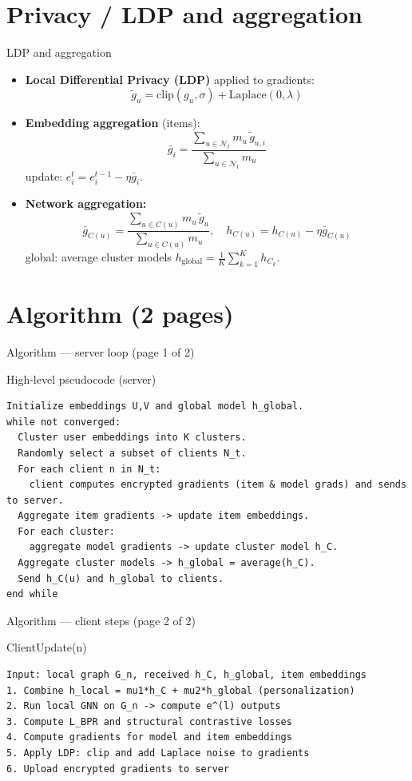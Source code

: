 \documentclass{beamer}
\begin{document}
\section{Privacy / LDP and aggregation}
\begin{frame}{LDP and aggregation}
  \begin{itemize}
    \item \textbf{Local Differential Privacy (LDP)} applied to gradients:
      \[
        \tilde g_u = \mathrm{clip}(g_u,\sigma) + \mathrm{Laplace}(0,\lambda)
      \]
    \item \textbf{Embedding aggregation} (items):
      \[
        \bar g_i = \frac{\sum_{u\in \mathcal{N}_t} m_u \,\tilde g_{u,i}}{\sum_{u\in \mathcal{N}_t} m_u}
      \]
      update: $e_i^{t}=e_i^{t-1}-\eta \bar g_i$.
    \item \textbf{Network aggregation:}
      \[
        \bar g_{C(u)} = \frac{\sum_{u\in C(u)} m_u\,\tilde g_u}{\sum_{u\in C(u)} m_u},\quad
        h_{C(u)} = h_{C(u)} - \eta \bar g_{C(u)}
      \]
      global: average cluster models $h_{\text{global}} = \frac{1}{K}\sum_{k=1}^K h_{C_k}$.
  \end{itemize}
\end{frame}

\section{Algorithm (2 pages)}
\begin{frame}[fragile]{Algorithm — server loop (page 1 of 2)}
\begin{block}{High-level pseudocode (server)}
\begin{verbatim}
Initialize embeddings U,V and global model h_global.
while not converged:
  Cluster user embeddings into K clusters.
  Randomly select a subset of clients N_t.
  For each client n in N_t:
    client computes encrypted gradients (item & model grads) and sends to server.
  Aggregate item gradients -> update item embeddings.
  For each cluster:
    aggregate model gradients -> update cluster model h_C.
  Aggregate cluster models -> h_global = average(h_C).
  Send h_C(u) and h_global to clients.
end while
\end{verbatim}
\end{block}
\end{frame}

\begin{frame}[fragile]{Algorithm — client steps (page 2 of 2)}
\begin{block}{ClientUpdate(n)}
\begin{verbatim}
Input: local graph G_n, received h_C, h_global, item embeddings
1. Combine h_local = mu1*h_C + mu2*h_global (personalization)
2. Run local GNN on G_n -> compute e^(l) outputs
3. Compute L_BPR and structural contrastive losses
4. Compute gradients for model and item embeddings
5. Apply LDP: clip and add Laplace noise to gradients
6. Upload encrypted gradients to server
\end{verbatim}
\end{block}
\end{frame}
\end{document}
